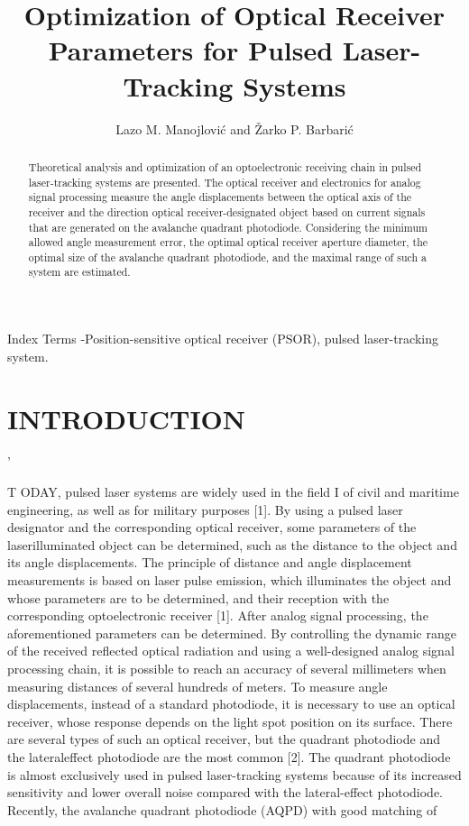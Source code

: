\documentclass[10pt]{article}
\title{Optimization of Optical Receiver Parameters for Pulsed Laser-Tracking Systems }
\author{Lazo M. Manojlović and Žarko P. Barbarić}
\date{}
\begin{document}
\maketitle


\begin{abstract}
Theoretical analysis and optimization of an optoelectronic receiving chain in pulsed laser-tracking systems are presented. The optical receiver and electronics for analog signal processing measure the angle displacements between the optical axis of the receiver and the direction optical receiver-designated object based on current signals that are generated on the avalanche quadrant photodiode. Considering the minimum allowed angle measurement error, the optimal optical receiver aperture diameter, the optimal size of the avalanche quadrant photodiode, and the maximal range of such a system are estimated.
\end{abstract}

Index Terms -Position-sensitive optical receiver (PSOR), pulsed laser-tracking system.

\section{INTRODUCTION}
’

T ODAY, pulsed laser systems are widely used in the field I of civil and maritime engineering, as well as for military purposes [1]. By using a pulsed laser designator and the corresponding optical receiver, some parameters of the laserilluminated object can be determined, such as the distance to the object and its angle displacements. The principle of distance and angle displacement measurements is based on laser pulse emission, which illuminates the object and whose parameters are to be determined, and their reception with the corresponding optoelectronic receiver [1]. After analog signal processing, the aforementioned parameters can be determined. By controlling the dynamic range of the received reflected optical radiation and using a well-designed analog signal processing chain, it is possible to reach an accuracy of several millimeters when measuring distances of several hundreds of meters. To measure angle displacements, instead of a standard photodiode, it is necessary to use an optical receiver, whose response depends on the light spot position on its surface. There are several types of such an optical receiver, but the quadrant photodiode and the lateraleffect photodiode are the most common [2]. The quadrant photodiode is almost exclusively used in pulsed laser-tracking systems because of its increased sensitivity and lower overall noise compared with the lateral-effect photodiode. Recently, the avalanche quadrant photodiode (AQPD) with good matching of
\end{document}
